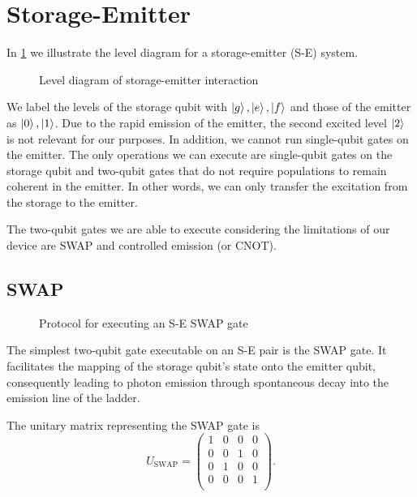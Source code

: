 \section{Storage-Emitter}
\label{sec:S-E}

In \cref{fig:level_S-E} we illustrate the level diagram for a storage-emitter (S-E) system.
\begin{figure}[h]
    \centering
    
    \vspace{-1cm}
    \caption{Level diagram of storage-emitter interaction}
    \label{fig:level_S-E}
\end{figure}

We label the levels of the storage qubit with $\ket{g}, \ket{e}, \ket{f}$ and those of the emitter as $\ket{0}, \ket{1}$.
Due to the rapid emission of the emitter, the second excited level $\ket{2}$ is not relevant for our purposes.
In addition, we cannot run single-qubit gates on the emitter.
The only operations we can execute are single-qubit gates on the storage qubit and two-qubit gates that do not require populations to remain coherent in the emitter.
In other words, we can only transfer the excitation from the storage to the emitter.

The two-qubit gates we are able to execute considering the limitations of our device are SWAP and controlled emission (or CNOT).

\subsection{SWAP}

\begin{figure}
    \centering
    
    \vspace{-1cm}
    \caption{Protocol for executing an S-E SWAP gate}
    \label{fig:S-E_SWAP}
\end{figure}

The simplest two-qubit gate executable on an S-E pair is the SWAP gate. 
It facilitates the mapping of the storage qubit's state onto the emitter qubit, consequently leading to photon emission through spontaneous decay into the emission line of the ladder.

The unitary matrix representing the SWAP gate is
\begin{equation}
    U_{\text{SWAP}} = 
    \begin{pmatrix}
    1 & 0 & 0 & 0 \\
    0 & 0 & 1 & 0 \\
    0 & 1 & 0 & 0 \\
    0 & 0 & 0 & 1 \\
\end{pmatrix}.
\end{equation}

